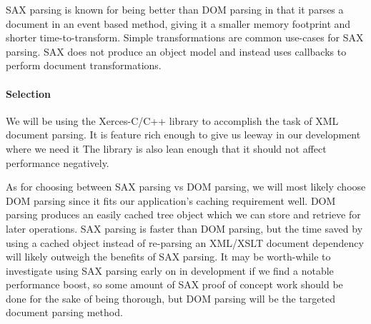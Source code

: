 SAX parsing is known for being better than DOM parsing in that it parses a document in an event based method, giving it a smaller memory footprint and shorter time-to-transform.
Simple transformations are common use-cases for SAX parsing.
SAX does not produce an object model and instead uses callbacks to perform document transformations.

\paragraph{Selection}

We will be using the Xerces-C/C++ library to accomplish the task of XML document parsing.
It is feature rich enough to give us leeway in our development where we need it
The library is also lean enough that it should not affect performance negatively.

As for choosing between SAX parsing vs DOM parsing, we will most likely choose DOM parsing since it fits our application's caching requirement well.
DOM parsing produces an easily cached tree object which we can store and retrieve for later operations.
SAX parsing is faster than DOM parsing, but the time saved by using a cached object instead of re-parsing an XML/XSLT document dependency will likely outweigh the benefits of SAX parsing.
It may be worth-while to investigate using SAX parsing early on in development if we find a notable performance boost, so some amount of SAX proof of concept work should be done for the sake of being thorough, but DOM parsing will be the targeted document parsing method.
